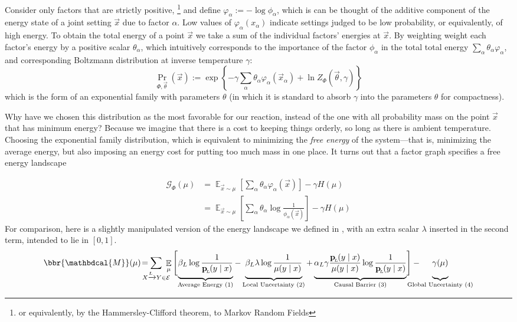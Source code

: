 \documentclass[letterpaper]{article} %
\theoremstyle{plain}
\theoremstyle{definition}
\theoremstyle{remark}
\let\H\relax
\DeclareMathOperator{\H}{\mathrm{H}} %
\DeclareMathOperator*{\E}{\mathbb{E}} %
\newcommand\mat[1]{\mathbf{#1}}
\newcommand{\bp}[1][L]{\mat{p}_{\!_{#1}\!}}
\newcommand{\Ed}{\mathcal E}
\newcommand{\dg}[1]{\mathbdcal{#1}}
\begin{document}
Consider only factors that are strictly positive,%
	\footnote{or equivalently, by the Hammersley-Clifford theorem, to Markov Random Fields}
and define $ \varphi_\alpha := -\log \phi_\alpha$, which is can be thought of the additive component of the energy state of a joint setting $\vec x$ due to factor $\alpha$. 
Low values of $\varphi_\alpha(x_\alpha)$ indicate settings judged to be low probability, or equivalently, of high energy. 
To obtain the total energy of a point $\vec x$ we take a sum of the individual factors' energies at $\vec x$. By weighting weight each factor's energy by a positive scalar $\theta_\alpha$, which intuitively corresponds to the importance of the factor $\phi_\alpha$ in the total total energy $\sum_\alpha \theta_\alpha \varphi_\alpha$,
and corresponding Boltzmann distribution at inverse temperature $\gamma$:
\[ \Pr_{\Phi, \vec\theta} (\vec x)  := \exp \left\{ -\gamma \sum_\alpha \theta_\alpha \varphi_\alpha(\vec x_\alpha)  + \ln Z_\Phi(\vec \theta, \gamma) \right\} \] 
which is the form of an exponential family with parameters $\theta$ (in which it is standard to absorb $\gamma$ into the parameters $\theta$ for compactness).

Why have we chosen this distribution as the most favorable for our reaction, instead of the one with all probability mass on the point $\vec x$ that has minimum energy? Because we imagine that there is a cost to keeping things orderly, so long as there is ambient temperature. Choosing the exponential family distribution, which is equivalent to minimizing the \emph{free energy} of the system---that is, minimizing the average energy, but also imposing an energy cost for putting too much mass in one place. It turns out that a factor graph specifies a free energy landscape

\begin{align*}
	\mathcal G_\Phi(\mu) &=  \E_{\vec x \sim \mu} \left[\sum_\alpha \theta_\alpha \varphi_\alpha(\vec x) \right] - \gamma H(\mu) \\
		&= \E_{\vec x \sim \mu} \left[\sum_\alpha \theta_\alpha \log \frac{1}{\phi_\alpha(\vec x)} \right] - \gamma H(\mu)
\end{align*}
For comparison, here is a slightly manipulated version of the energy landscape we defined in , with an extra scalar $\lambda$ inserted in the second term, intended to lie in $[0,1]$.
\begin{equation*}
	\bbr{\dg M}(\mu) \!=\mskip-18mu \sum_{ X \xrightarrow{\!\!L} Y  \in \Ed } \!\!\!\!\E_\mu  \Bigg[\!
		\underbrace{\beta_L \log \frac{1}{\bp(y\mid x)} \vphantom{\Bigg|}}_{\text{Average Energy (1)}}  - 
		\underbrace{\beta_L \lambda \log \frac{1}{\mu(y \mid x)}  \vphantom{\Bigg|}}_{\text{Local Uncertainty (2)}}  + 
		\underbrace{\alpha_L \gamma \frac{\bp(y \mid x)}{\mu(y \mid x)}\log \frac{1}{\bp(y\mid x)}  \vphantom{\Bigg|}}_{\text{Causal Barrier (3)}}\! \Bigg] - 
		\mskip-31mu\underbrace{\gamma \H(\mu) \vphantom{\Bigg|} }_{\text{Global Uncertainty (4)}}
\end{equation*}
\end{document}
